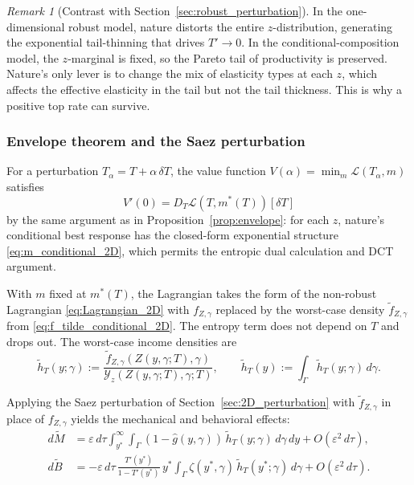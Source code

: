 \documentclass[12pt,a4paper]{article}
\theoremstyle{definition}
\theoremstyle{plain}
\theoremstyle{remark}
\newtheorem{remark}{Remark}[section]
\newcommand{\calL}{\mathcal{L}}
\newcommand{\calY}{\mathcal{Y}}
\begin{document}
\begin{remark}[Contrast with Section~\ref{sec:robust_perturbation}]
\label{rem:conditional_vs_joint}
In the one-dimensional robust model, nature distorts the entire $z$-distribution, generating the exponential tail-thinning that drives $T' \to 0$.  In the conditional-composition model, the $z$-marginal is fixed, so the Pareto tail of productivity is preserved.  Nature's only lever is to change the mix of elasticity types at each $z$, which affects the effective elasticity in the tail but not the tail thickness.  This is why a positive top rate can survive.
\end{remark}

\subsubsection{Envelope theorem and the Saez perturbation}

For a perturbation $T_{\alpha} = T + \alpha\,\delta T$, the value function $V(\alpha) = \min_m \calL(T_{\alpha},m)$ satisfies
\[
  V'(0) = D_T\calL(T,m^*(T))[\delta T]
\]
by the same argument as in Proposition~\ref{prop:envelope}: for each $z$, nature's conditional best response has the closed-form exponential structure \eqref{eq:m_conditional_2D}, which permits the entropic dual calculation and DCT argument.

With $m$ fixed at $m^*(T)$, the Lagrangian takes the form of the non-robust Lagrangian \eqref{eq:Lagrangian_2D} with $f_{Z,\gamma}$ replaced by the worst-case density $\widetilde{f}_{Z,\gamma}$ from \eqref{eq:f_tilde_conditional_2D}.  The entropy term does not depend on $T$ and drops out.  The worst-case income densities are
\begin{equation}
\label{eq:h_tilde_2D}
  \widetilde{h}_T(y;\gamma) := \frac{\widetilde{f}_{Z,\gamma}(Z(y,\gamma;T),\gamma)}{\calY_z(Z(y,\gamma;T),\gamma;T)}, \qquad
  \widetilde{h}_T(y) := \int_{\Gamma}\widetilde{h}_T(y;\gamma)\,d\gamma.
\end{equation}

Applying the Saez perturbation of Section~\ref{sec:2D_perturbation} with $\widetilde{f}_{Z,\gamma}$ in place of $f_{Z,\gamma}$ yields the mechanical and behavioral effects:
\begin{align}
  d\widetilde{M} &= \varepsilon\,d\tau\int_{y^*}^{\infty}\int_{\Gamma}(1-\hat{g}(y,\gamma))\,\widetilde{h}_T(y;\gamma)\,d\gamma\,dy + O(\varepsilon^2\,d\tau), \label{eq:dM_tilde_2D} \\
  d\widetilde{B} &= -\varepsilon\,d\tau\,\frac{T'(y^*)}{1-T'(y^*)}\,y^*\int_{\Gamma}\zeta(y^*,\gamma)\,\widetilde{h}_T(y^*;\gamma)\,d\gamma + O(\varepsilon^2\,d\tau). \label{eq:dB_tilde_2D}
\end{align}
\end{document}
